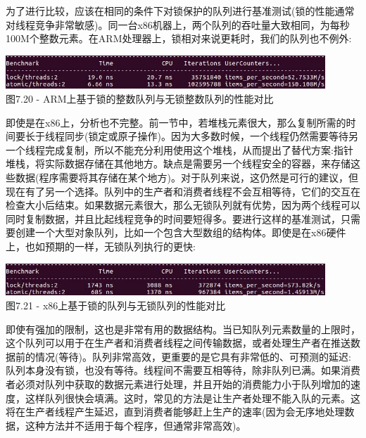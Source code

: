 为了进行比较，应该在相同的条件下对锁保护的队列进行基准测试(锁的性能通常对线程竞争非常敏感)。同一台x86机器上，两个队列的吞吐量大致相同，为每秒100M个整数元素。在ARM处理器上，锁相对来说更耗时，我们的队列也不例外:

\begin{center}
\includegraphics[width=0.9\textwidth]{content/2/chapter7/images/20.jpg}\\
图7.20 - ARM上基于锁的整数队列与无锁整数队列的性能对比
\end{center}

即使是在x86上，分析也不完整。前一节中，若堆栈元素很大，那么复制所需的时间要长于线程同步(锁定或原子操作)。因为大多数时候，一个线程仍然需要等待另一个线程完成复制，所以不能充分利用使用这个堆栈，从而提出了替代方案:指针堆栈，将实际数据存储在其他地方。缺点是需要另一个线程安全的容器，来存储这些数据(程序需要将其存储在某个地方)。对于队列来说，这仍然是可行的建议，但现在有了另一个选择。队列中的生产者和消费者线程不会互相等待，它们的交互在检查大小后结束。如果数据元素很大，那么无锁队列就有优势，因为两个线程可以同时复制数据，并且比起线程竞争的时间要短得多。要进行这样的基准测试，只需要创建一个大型对象队列，比如一个包含大型数组的结构体。即使是在x86硬件上，也如预期的一样，无锁队列执行的更快:

\begin{center}
\includegraphics[width=0.9\textwidth]{content/2/chapter7/images/21.jpg}\\
图7.21 - x86上基于锁的队列与无锁队列的性能对比
\end{center}

即使有强加的限制，这也是非常有用的数据结构。当已知队列元素数量的上限时，这个队列可以用于在生产者和消费者线程之间传输数据，或者处理生产者在推送数据前的情况(等待)。队列非常高效，更重要的是它具有非常低的、可预测的延迟:队列本身没有锁，也没有等待。线程间不需要互相等待，除非队列已满。如果消费者必须对队列中获取的数据元素进行处理，并且开始的消费能力小于队列增加的速度，这样队列很快会填满。这时，常见的方法是让生产者处理不能入队的元素。这将在生产者线程产生延迟，直到消费者能够赶上生产的速率(因为会无序地处理数据，这种方法并不适用于每个程序，但通常非常高效)。

